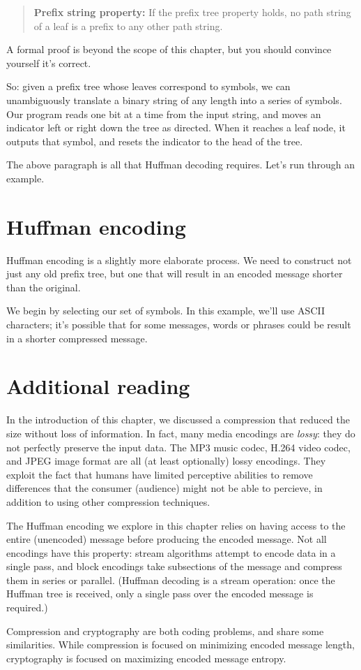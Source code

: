 \begin{quotation}
\textbf{Prefix string property:} If the prefix tree property holds, no path string of a leaf is a prefix to any other path string.
\end{quotation}

A formal proof is beyond the scope of this chapter, but you should convince yourself it's correct.

So: given a prefix tree whose leaves correspond to symbols, we can unambiguously translate a binary string of any length into a series of symbols. Our program reads one bit at a time from the input string, and moves an indicator left or right down the tree as directed. When it reaches a leaf node, it outputs that symbol, and resets the indicator to the head of the tree.

The above paragraph is all that Huffman decoding requires. Let's run through an example.


\section{Huffman encoding}

Huffman encoding is a slightly more elaborate process. We need to construct not just any old prefix tree, but one that will result in an encoded message shorter than the original.

We begin by selecting our set of symbols. In this example, we'll use ASCII characters; it's possible that for some messages, words or phrases could be result in a shorter compressed message.


\section{Additional reading}

In the introduction of this chapter, we discussed a compression that reduced the size without loss of information. In fact, many media encodings are \textit{lossy}: they do not perfectly preserve the input data. The MP3 music codec, H.264 video codec, and JPEG image format are all (at least optionally) lossy encodings. They exploit the fact that humans have limited perceptive abilities to remove differences that the consumer (audience) might not be able to percieve, in addition to using other compression techniques.

The Huffman encoding we explore in this chapter relies on having access to the entire (unencoded) message before producing the encoded message. Not all encodings have this property: stream algorithms attempt to encode data in a single pass, and block encodings take subsections of the message and compress them in series or parallel. (Huffman decoding is a stream operation: once the Huffman tree is received, only a single pass over the encoded message is required.)

Compression and cryptography are both coding problems, and share some similarities. While compression is focused on minimizing encoded message length, cryptography is focused on maximizing encoded message entropy.
